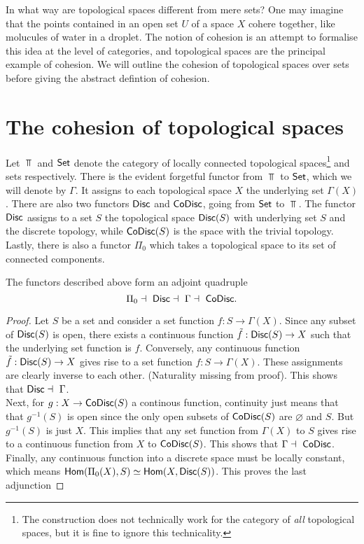 In what way are topological spaces different from mere sets? One may imagine that the points contained in an open set $U$ of a space $X$ cohere together, like molucules of water in a droplet. The notion of cohesion is an attempt to formalise this idea at the level of categories, and topological spaces are the principal example of cohesion. We will outline the cohesion of topological spaces over sets before giving the abstract defintion of cohesion.\\

\section{The cohesion of topological spaces}
Let $\Top$ and $\mathsf{Set}$ denote the category of locally connected topological spaces\footnote{The construction does not technically work for the category of \textit{all} topological spaces, but it is fine to ignore this technicality.} and sets respectively. There is the evident forgetful functor from $\Top$ to $\mathsf{Set}$, which we will denote by $\Gamma$. It assigns to each topological space $X$ the underlying set $\Gamma(X)$. There are also two functors $\mathsf{Disc}$ and $\mathsf{CoDisc}$, going from $\mathsf{Set}$ to $\Top$. The functor $\mathsf{Disc}$ assigns to a set $S$ the topological space $\mathsf{Disc}(S)$ with underlying set $S$ and the discrete topology, while $\mathsf{CoDisc}(S)$ is the space with the trivial topology. Lastly, there is also a functor $\Pi_0$ which takes a topological space to its set of connected components.
\begin{proposition}
  The functors described above form an adjoint quadruple \[\Pi_0 \dashv\ \Disc \dashv\ \Gamma \dashv\ \CoDisc.\]
\end{proposition}
\begin{proof}
  Let $S$ be a set and consider a set function $f: S \to \Gamma(X)$. Since any subset of $\mathsf{Disc}(S)$ is open, there exists a continuous function $\tilde{f}: \mathsf{Disc}(S) \to X$ such that the underlying set function is $f$. Conversely, any continuous function $\tilde{f} : \mathsf{Disc}(S) \to X$ gives rise to a set function $ f: S \to \Gamma(X)$. These assignments are clearly inverse to each other. (Naturality missing from proof). This shows that $\Disc \dashv\ \Gamma$.\\
  Next, for $g: X \to \mathsf{CoDisc}(S)$ a continous function, continuity just means that that $g^{-1}(S)$ is open since the only open subsets of $\mathsf{CoDisc}(S)$ are $\varnothing$ and $S$.
  But $g^{-1}(S)$ is just $X$. This implies that any set function from $\Gamma(X)$ to $S$ gives rise to a continuous function from $X$ to $\mathsf{CoDisc}(S)$. This shows that $\Gamma \dashv\ \mathsf{CoDisc}$.\\
  Finally, any continuous function into a discrete space must be locally constant, which means $\mathsf{Hom}(\Pi_0(X), S) \simeq \mathsf{Hom}(X, \mathsf{Disc}(S))$. This proves the last adjunction
\end{proof}

